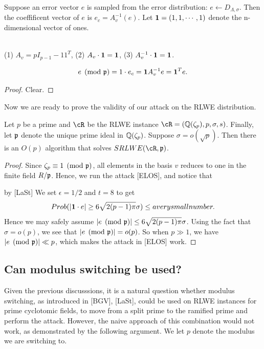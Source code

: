 \documentclass{amsart}
\begin{document}
Suppose an error vector $e$ is sampled from the error distribution: $e \gets D_{\Lambda, \sigma}$.  Then the coeffificent vector of $e$ is $e_c = A_v^{-1}(e)$.
Let ${\bf 1} = (1,1, \cdots,1)$ denote the n-dimensional vector of ones.

\begin{Lemma} \qquad \\
(1) $A_v = pI_{p-1} - 11^T$,
(2) $A_v \cdot {\bf 1} = {\bf 1}$,
(3) $A_v^{-1} \cdot {\bf 1} = {\bf 1}$.
\end{Lemma}

\begin{Lemma}
\[
e\pmod{\mathfrak{p}} = 1 \cdot e_c = {\bf 1} A_v^{-1} e = {\bf 1}^T e.
\]
\end{Lemma}
\begin{proof}
Clear.
\end{proof}

Now we are ready to prove the validity of our attack on the
RLWE distribution.
\begin{theorem}
Let $p$ be a prime and $\cR$ be the RLWE instance $\cR = (\bQ(\zeta_p), p,\sigma,s)$. Finally, let $\mathfrak{p}$ denote the unique prime ideal in $\mathbb{Q}(\zeta_p)$. Suppose $\sigma = o(\sqrt{p})$. Then there is an $O(p)$ algorithm that solves $SRLWE(\cR,\fp)$.
\end{theorem}

\begin{proof}
Since $\zeta_p \equiv 1 \pmod{\mathfrak{p}}$, all elements in the basis $v$ reduces to one in the finite field $R/\mathfrak{p}$. Hence, we run the attack [ELOS], and notice that

by [LaSt] We set $\epsilon = 1/2$ and $t  = 8$ to get
\[
Prob(|{\bf 1} \cdot e| \geq 6\sqrt{2(p-1)\pi} \sigma) \leq a very small number.
\]
Hence we may safely assume
$|e \pmod{\mathfrak{p}}|\leq 6\sqrt{2(p-1)\pi} \sigma$. Using the fact that $\sigma = o(p)$, we see that $|e \pmod{\mathfrak{p}}| = o(p)$. So when $p \gg 1$, we have  $|e \pmod{\mathfrak{p}}| \ll p$, which makes the attack in [ELOS] work.
\end{proof}

\subsection{Can modulus switching be used?}

Given the previous discusssions, it is a natural question whether modulus switching, as introduced in [BGV], [LaSt],
could be used on RLWE instances for prime cyclotomic fields, to move from a split prime to the ramified prime and perform the attack. However, the naive approach of this combination would not work, as demonstrated by the following argument.
We let $p$ denote the modulus we are switching to.
\end{document}
